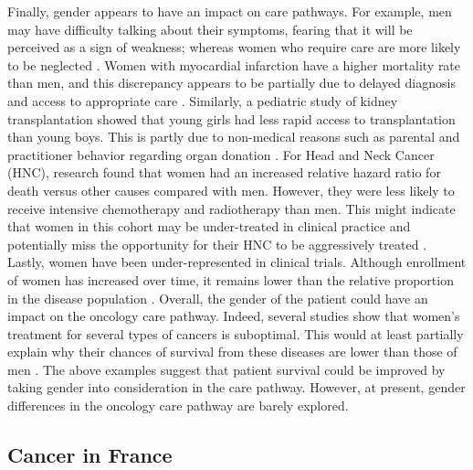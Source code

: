 Finally, gender appears to have an impact on care pathways. For example, men may
have difficulty talking about their symptoms, fearing that it will be perceived
as a sign of weakness; whereas women who require care are more likely to be
neglected \cite{ferrari_gender_2018}. Women with myocardial infarction have a
higher mortality rate than men, and this discrepancy appears to be partially due
to delayed diagnosis and access to appropriate care
\cite{bugiardini_delayed_2017}. Similarly, a pediatric study of kidney
transplantation showed that young girls had less rapid access to transplantation
than young boys. This is partly due to non-medical reasons such as parental and
practitioner behavior regarding organ donation \cite{hogan_j_gender_2016}. For
Head and Neck Cancer (HNC), research found that women had an increased relative
hazard ratio for death versus other causes compared with men. However, they were
less likely to receive intensive chemotherapy and radiotherapy than men. This
might indicate that women in this cohort may be under-treated in clinical
practice and potentially miss the opportunity for their HNC to be aggressively
treated \cite{park_a_undertreatment_2019}. Lastly, women have been
under-represented in clinical trials. Although enrollment of women has increased
over time, it remains lower than the relative proportion in the disease
population \cite{gong_temporal_2019}. Overall, the gender of the patient could
have an impact on the oncology care pathway. Indeed, several studies show that
women's treatment for several types of cancers is suboptimal. This would at
least partially explain why their chances of survival from these diseases are
lower than those of men
\cite{park_a_undertreatment_2019,carter_paulson_e_gender_2009,rose_sex_2016}.
The above examples suggest that patient survival could be improved by taking
gender into consideration in the care pathway. However, at present, gender
differences in the oncology care pathway are barely explored.

\subsection{Cancer in France}

